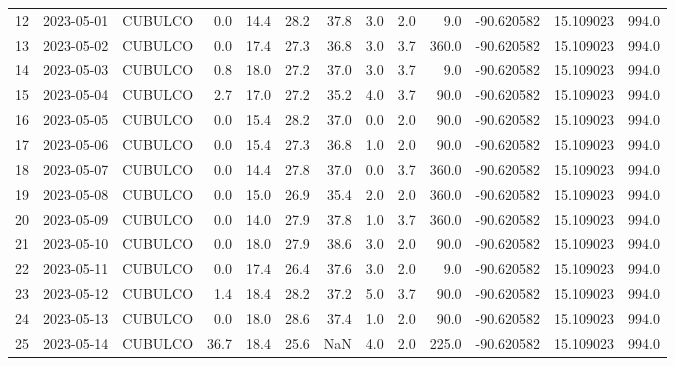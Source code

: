 \documentclass[12pt]{article}
\begin{document}
\begin{center}
\begin{tabular}{lllrrrrrrrrrr}
12  & 2023-05-01 &  CUBULCO &     0.0 &  14.4 &   28.2 &  37.8 &  3.0 &         2.0 &         9.0 & -90.620582 &  15.109023 &    994.0 \\
13  & 2023-05-02 &  CUBULCO &     0.0 &  17.4 &   27.3 &  36.8 &  3.0 &         3.7 &       360.0 & -90.620582 &  15.109023 &    994.0 \\
14  & 2023-05-03 &  CUBULCO &     0.8 &  18.0 &   27.2 &  37.0 &  3.0 &         3.7 &         9.0 & -90.620582 &  15.109023 &    994.0 \\
15  & 2023-05-04 &  CUBULCO &     2.7 &  17.0 &   27.2 &  35.2 &  4.0 &         3.7 &        90.0 & -90.620582 &  15.109023 &    994.0 \\
16  & 2023-05-05 &  CUBULCO &     0.0 &  15.4 &   28.2 &  37.0 &  0.0 &         2.0 &        90.0 & -90.620582 &  15.109023 &    994.0 \\
17  & 2023-05-06 &  CUBULCO &     0.0 &  15.4 &   27.3 &  36.8 &  1.0 &         2.0 &        90.0 & -90.620582 &  15.109023 &    994.0 \\
18  & 2023-05-07 &  CUBULCO &     0.0 &  14.4 &   27.8 &  37.0 &  0.0 &         3.7 &       360.0 & -90.620582 &  15.109023 &    994.0 \\
19  & 2023-05-08 &  CUBULCO &     0.0 &  15.0 &   26.9 &  35.4 &  2.0 &         2.0 &       360.0 & -90.620582 &  15.109023 &    994.0 \\
20  & 2023-05-09 &  CUBULCO &     0.0 &  14.0 &   27.9 &  37.8 &  1.0 &         3.7 &       360.0 & -90.620582 &  15.109023 &    994.0 \\
21  & 2023-05-10 &  CUBULCO &     0.0 &  18.0 &   27.9 &  38.6 &  3.0 &         2.0 &        90.0 & -90.620582 &  15.109023 &    994.0 \\
22  & 2023-05-11 &  CUBULCO &     0.0 &  17.4 &   26.4 &  37.6 &  3.0 &         2.0 &         9.0 & -90.620582 &  15.109023 &    994.0 \\
23  & 2023-05-12 &  CUBULCO &     1.4 &  18.4 &   28.2 &  37.2 &  5.0 &         3.7 &        90.0 & -90.620582 &  15.109023 &    994.0 \\
24  & 2023-05-13 &  CUBULCO &     0.0 &  18.0 &   28.6 &  37.4 &  1.0 &         2.0 &        90.0 & -90.620582 &  15.109023 &    994.0 \\
25  & 2023-05-14 &  CUBULCO &    36.7 &  18.4 &   25.6 &   NaN &  4.0 &         2.0 &       225.0 & -90.620582 &  15.109023 &    994.0 \\
\bottomrule
\end{tabular}

        
        \end{center}
        
\end{document}
